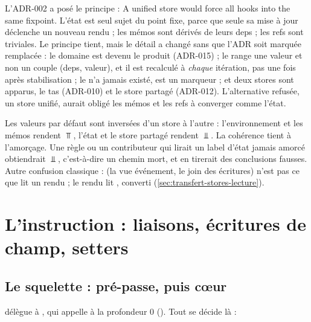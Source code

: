\begin{decision}
  L'ADR-002 a posé le principe : \og A unified store would force all hooks
  into the same fixpoint\fg{}. L'état est seul sujet du point fixe, parce
  que seule sa mise à jour déclenche un nouveau rendu ; les mémos sont
  dérivés de leurs deps ; les refs sont triviales. Le principe tient, mais le
  détail a changé sans que l'ADR soit marquée remplacée : le domaine est
  devenu le produit  (ADR-015) ; le  range
  une valeur et non un couple (deps, valeur), et il est recalculé à
  \emph{chaque} itération, pas une fois après stabilisation ; le
   n'a jamais existé,  est un marqueur
   ; et deux stores sont apparus, le tas (ADR-010) et le
  store partagé (ADR-012). L'alternative refusée, un store unifié, aurait
  obligé les mémos et les refs à converger comme l'état.
\end{decision}

\begin{piege}
  Les valeurs par défaut sont inversées d'un store à l'autre :
  l'environnement et les mémos rendent $\Top$, l'état et le store partagé
  rendent $\Bot$. La cohérence tient à l'amorçage. Une règle ou un contributeur
  qui lirait un label d'état jamais amorcé obtiendrait $\Bot$, c'est-à-dire
  un chemin mort, et en tirerait des conclusions fausses. Autre confusion
  classique :  (la vue événement, le join des
  écritures) n'est pas ce que lit un rendu ; le rendu lit
  , converti (\cref{sec:transfert-stores-lecture}).
\end{piege}

\section{L'instruction : liaisons, écritures de champ, setters}
\label{sec:transfert-stores-instruction}

\subsection{Le squelette : pré-passe, puis cœur}

 délègue à , qui
appelle  à la profondeur $0$
(). Tout se décide là :

